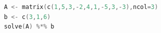 \begin{lstlisting}[language=c++,label={code:09_05},caption={連立方程式を解く}]
A <- matrix(c(1,5,3,-2,4,1,-5,3,-3),ncol=3)
b <- c(3,1,6)
solve(A) %*% b
\end{lstlisting}
